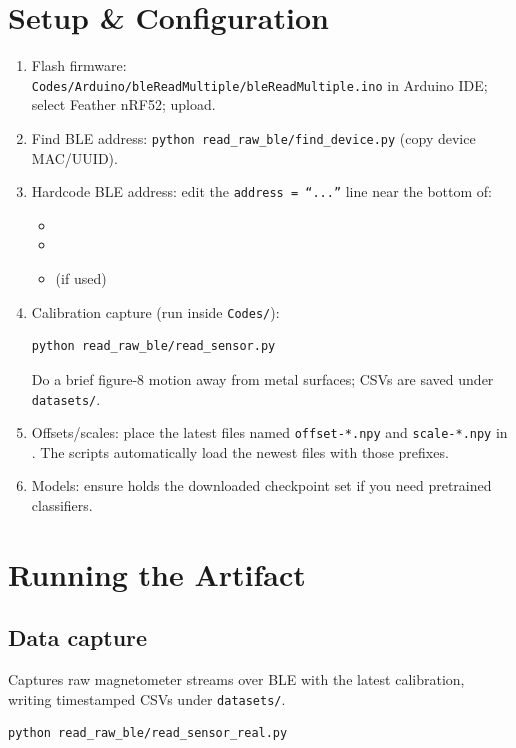 \documentclass[conference]{IEEEtran}
\begin{document}
\section{Setup \& Configuration}
\label{sec:setup}
\begin{enumerate}
  \item Flash firmware:\\
  {\scriptsize\texttt{Codes/Arduino/bleReadMultiple/bleReadMultiple.ino}} in Arduino IDE;\\
  select Feather nRF52; upload.
  \item Find BLE address: \texttt{python read\_raw\_ble/find\_device.py} (copy device MAC/UUID).
  \item Hardcode BLE address: edit the \texttt{address = ``...''} line near the bottom of:
  \begin{itemize}
    \item {}
    \item {}
    \item {} (if used)
  \end{itemize}
  \item Calibration capture (run inside \texttt{Codes/}):\\
  \begin{verbatim}
python read_raw_ble/read_sensor.py
  \end{verbatim}
  Do a brief figure-8 motion away from metal surfaces; CSVs are saved under \texttt{datasets/}.
  \item Offsets/scales: place the latest files named \texttt{offset-*.npy} and \texttt{scale-*.npy} in . The scripts automatically load the newest files with those prefixes.
  \item Models: ensure  holds the downloaded checkpoint set if you need pretrained classifiers.
\end{enumerate}

\section{Running the Artifact}
\label{sec:running}
\subsection{Data capture}
\noindent Captures raw magnetometer streams over BLE with the latest calibration, writing timestamped CSVs under \texttt{datasets/}.
\begin{verbatim}
python read_raw_ble/read_sensor_real.py
\end{verbatim}
\end{document}
